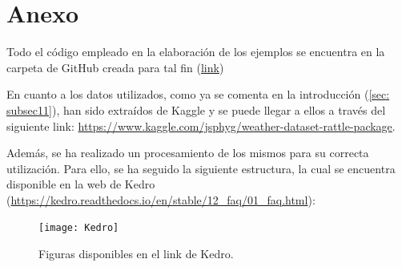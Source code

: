 \documentclass[12pt,twoside]{article}
\begin{document}
\newpage
\section{Anexo} \label{sec:Anexo}
Todo el código empleado en la elaboración de los ejemplos se encuentra en la carpeta de GitHub creada para tal fin (\url{link})

En cuanto a los datos utilizados, como ya se comenta en la introducción (\ref{sec: subsec11}), han sido extraídos de Kaggle y se puede llegar a ellos a través del siguiente link: \url{https://www.kaggle.com/jsphyg/weather-dataset-rattle-package}.

Además, se ha realizado un procesamiento de los mismos para su correcta utilización. Para ello, se ha seguido la siguiente estructura, la cual se encuentra disponible en la web de Kedro (\url{https://kedro.readthedocs.io/en/stable/12_faq/01_faq.html}):
\begin{figure}[h]
\centering
\texttt{[image: Kedro]}
\caption{Figuras disponibles en el link de Kedro.}
\end{figure}
\end{document}
